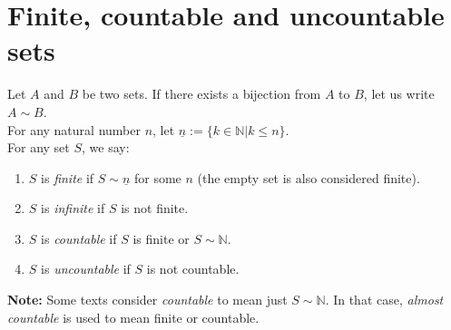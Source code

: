 \section{Finite, countable and uncountable sets}
Let $A$ and $B$ be two sets. If there exists a bijection from $A$ to $B$, let us write $A\sim B$.\\
For any natural number $n$, let $\underline{n}:=\{k\in\mathbb{N}|k\le n\}.$\\
For any set $S$, we say:
\begin{enumerate}[nosep, label=(\alph*)]
    \item $S$ is \textit{finite} if $S\sim \underline{n}$ for some $n$ (the empty set is also considered finite).
    \item $S$ is \textit{infinite} if $S$ is not finite.
    \item $S$ is \textit{countable} if $S$ is finite or $S\sim\mathbb{N}$.
    \item $S$ is \textit{uncountable} if $S$ is not countable.
\end{enumerate}
\textbf{Note:} Some texts consider \textit{countable} to mean just $S\sim \mathbb{N}$. In that case, \textit{almost countable} is used to mean finite or countable.

\hrulefill
{}

\hrulefill